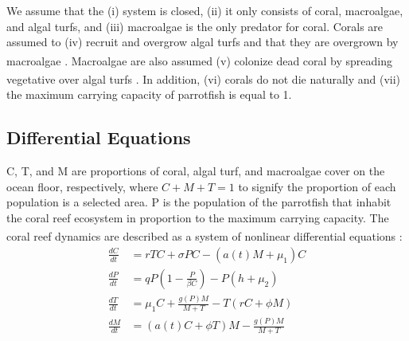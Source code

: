 \documentclass[12pt]{article}
\begin{document}
We assume that the (i) system is closed, (ii) it only consists of coral, macroalgae, and algal turfs, and (iii) macroalgae is the only predator for coral. Corals are assumed to (iv) recruit and overgrow algal turfs and that they are overgrown by macroalgae \textsuperscript{\cite{04_mathanalysis}}. Macroalgae are also assumed (v) colonize dead coral by spreading vegetative over algal turfs \textsuperscript{\cite{04_mathanalysis}}. In addition, (vi) corals do not die naturally and (vii) the maximum carrying capacity of parrotfish is equal to 1.


\subsection{Differential Equations}
C, T, and M are proportions of coral, algal turf, and macroalgae cover on the ocean floor, respectively,  where $C+M+T=1$ to signify the proportion of each population is a selected area. P is the population of the parrotfish that inhabit the coral reef ecosystem in proportion to the maximum carrying capacity. The coral reef dynamics are described as a system of nonlinear differential equations \textsuperscript{\cite{13_blackwood_hastings_mumby_2010}}: 
\begin{align}
    \frac{dC}{dt} &= rTC + \sigma P C- (a(t)M+\mu_{1})C \label{eq:dCdt}\\
    \frac{dP}{dt} &= qP \left( 1-\frac{P}{\beta C} \right) - P \left( h+\mu_{2} \right) \label{eq:dPdt}\\
    \frac{dT}{dt} &= \mu_{1}C + \frac{g(P)M}{M+T} - T(rC+\phi M) \label{eq:dTdt}\\
    \frac{dM}{dt} &= (a(t)C+ \phi T)M - \frac{g(P)M}{M+T} \label{eq:dMdt}
\end{align}
\end{document}
